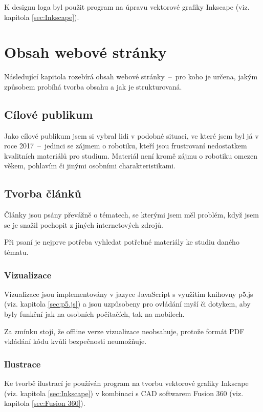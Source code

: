 \documentclass[a4paper, 12pt]{article}
\begin{document}
  K designu loga byl použit program na úpravu vektorové grafiky Inkscape (viz. kapitola \ref{sec:Inkscape}).


  \section{Obsah webové stránky}
  Následující kapitola rozebírá obsah webové stránky~--~pro koho je určena, jakým způsobem probíhá tvorba obsahu a jak je strukturovaná.


  \subsection{Cílové publikum}
  Jako cílové publikum jsem si vybral lidi v podobné situaci, ve které jsem byl já v roce 2017~--~jedinci se zájmem o robotiku, kteří jsou frustrovaní nedostatkem kvalitních materiálů pro studium. Materiál není kromě zájmu o robotiku omezen věkem, pohlavím či jinými osobními charakteristikami.


  \subsection{Tvorba článků} \label{sec:Tvorba článků}
  Články jsou psány převážně o tématech, se kterými jsem měl problém, když jsem se je snažil pochopit z jiných internetových zdrojů.

  Při psaní je nejprve potřeba vyhledat potřebné materiály ke studiu daného tématu.


  \subsubsection{Vizualizace} \label{sec:Vizualizace}
  Vizualizace jsou implementovány v jazyce JavaScript s využitím knihovny p5.js (viz. kapitola \ref{sec:p5.js}) a jsou uzpůsobeny pro ovládání myší či dotykem, aby byly funkční jak na osobních počítačích, tak na mobilech.

  Za zmínku stojí, že offline verze vizualizace neobsahuje, protože formát PDF vkládání kódu kvůli bezpečnosti neumožňuje\cite{history-of-pdf}.


  \subsubsection{Ilustrace} \label{sec:Ilustrace}
  Ke tvorbě ilustrací je používán program na tvorbu vektorové grafiky Inkscape (viz. kapitola \ref{sec:Inkscape}) v kombinaci s CAD softwarem Fusion 360 (viz. kapitola \ref{sec:Fusion 360}).
\end{document}
